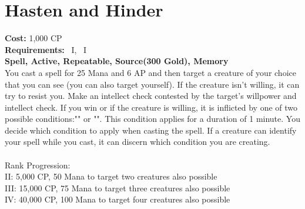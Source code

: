 \section{Hasten and Hinder}\label{spell:hastenHinder}
\textbf{Cost:} 1,000 CP\\
\textbf{Requirements:}~ I,~ I\\
\textbf{Spell, Active, Repeatable, Source(300 Gold), Memory}\\
You cast a spell for 25 Mana and 6 AP and then target a creature of your choice that you can see (you can also target yourself).
If the creature isn't willing, it can try to resist you.
Make an intellect check contested by the target's willpower and intellect check.
If you win or if the creature is willing, it is inflicted by one of two possible conditions:"" or "".
This condition applies for a duration of 1 minute.
You decide which condition to apply when casting the spell.
If a creature can identify your spell while you cast, it can discern which condition you are creating.\\
\\
Rank Progression:\\
II: 5,000 CP, 50 Mana to target two creatures also possible\\
III: 15,000 CP, 75 Mana to target three creatures also possible\\
IV: 40,000 CP, 100 Mana to target four creatures also possible \\